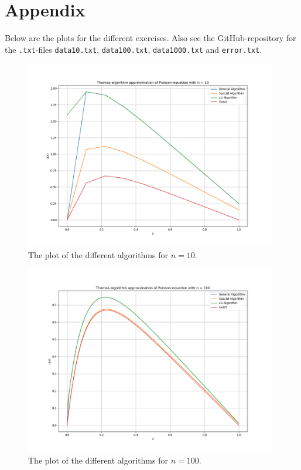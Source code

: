 \documentclass{article}
\begin{document}
\section{Appendix} \label{sec:Appendix}

Below are the plots for the different exercises. Also see the GitHub-repository for the \texttt{.txt}-files \texttt{data10.txt}, \texttt{data100.txt}, \texttt{data1000.txt} and \texttt{error.txt}.


\begin{figure}[ht]
	\centering
	\includegraphics[width = 11cm]{program/data10.png}
	\caption{The plot of the different algorithms for $n = 10$. }
  \label{fig:data10png}
\end{figure}

\begin{figure}[ht]
	\centering
	\includegraphics[width = 11cm]{program/data100.png}
	\caption{The plot of the different algorithms for $n = 100$. }
  \label{fig:data100png}
\end{figure}
\end{document}
